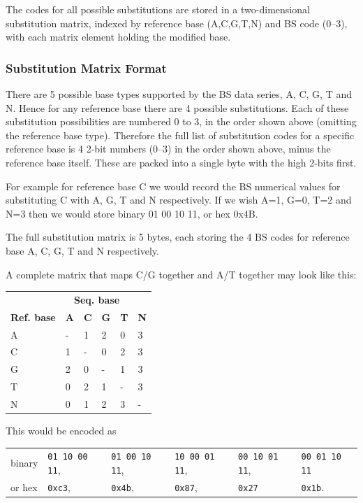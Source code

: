 \documentclass[a4paper]{article}
\begin{document}
The codes for all possible substitutions are stored in a
two-dimensional substitution matrix, indexed by reference base
(A,C,G,T,N) and BS code (0--3), with each matrix element holding the
modified base.

\subsubsection*{Substitution Matrix Format}

There are 5 possible base types supported by the BS data series, A, C,
G, T and N.  Hence for any reference base there are 4 possible
substitutions.  Each of these substitution possibilities are numbered
0 to 3, in the order shown above (omitting the reference base type).
Therefore the full list of substitution codes for a specific reference
base is 4 2-bit numbers (0--3) in the order shown above, minus the
reference base itself.  These are packed into a single byte with the
high 2-bits first.

For example for reference base C we would record the BS numerical
values for substituting C with A, G, T and N respectively.  If we wish
A=1, G=0, T=2 and N=3 then we would store binary 01 00 10 11, or hex 0x4B.

The full substitution matrix is 5 bytes, each storing the 4 BS codes
for reference base A, C, G, T and N respectively.

A complete matrix that maps C/G together and A/T together may look like this:

\begin{tabular}{l|lllll}
& \multicolumn{4}{c}{\textbf{Seq. base}}\\
\textbf{Ref. base} & \textbf{A} & \textbf{C} & \textbf{G} & \textbf{T} & \textbf{N} \\
\hline
A & - & 1 & 2 & 0 & 3 \\
C & 1 & - & 0 & 2 & 3 \\
G & 2 & 0 & - & 1 & 3 \\
T & 0 & 2 & 1 & - & 3 \\
N & 0 & 1 & 2 & 3 & - \\
\end{tabular}

\vskip10pt
This would be encoded as

\begin{tabular}{llllll}
binary & \texttt{01 10 00 11}, & \texttt{01 00 10 11}, & \texttt{10 00 01 11},  & \texttt{00 10 01 11}, & \texttt{00 01 10 11}\\
or hex & \texttt{0xc3}, & \texttt{0x4b},& \texttt{0x87}, & \texttt{0x27} &\texttt{0x1b}.\\
\end{tabular}
\end{document}
